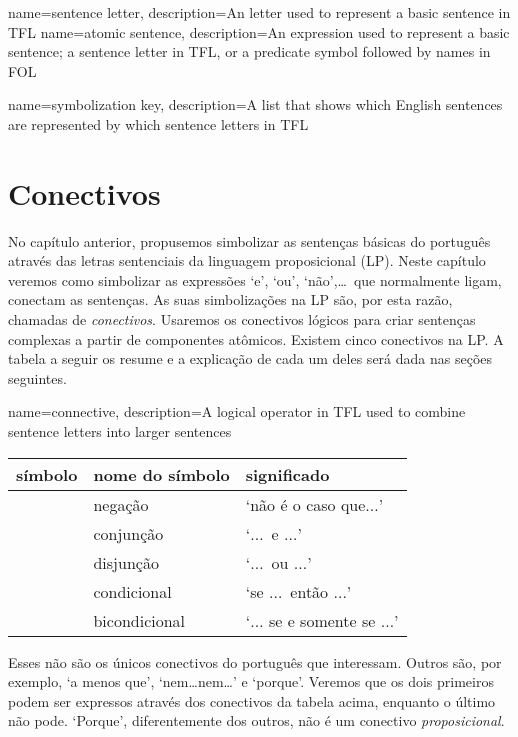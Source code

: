 {
name=sentence letter,
description={An letter used to represent a basic sentence in TFL}
}
{
name=atomic sentence,
description={An expression used to represent a basic sentence; a sentence letter in TFL, or a predicate symbol followed by names in FOL}
}

{
name=symbolization key,
description={A list that shows which English sentences are represented by which \glspl{sentence letter} in TFL}
}


\chapter{Conectivos}
\label{s:TFLConnectives}

No capítulo anterior, propusemos simbolizar as sentenças básicas do português através das letras sentenciais da linguagem proposicional (LP).
Neste capítulo veremos como simbolizar as expressões `e', `ou', `não',\ldots\ 
que normalmente ligam, conectam as sentenças.
As suas simbolizações na LP são, por esta razão, chamadas de \emph{conectivos}.
Usaremos os conectivos lógicos para criar sentenças complexas a partir de componentes atômicos. Existem cinco conectivos na LP.
A tabela a seguir os resume e a explicação de cada um deles será dada nas seções seguintes.


{
name=connective,
description={A logical operator in TFL used to combine \glspl{sentence letter} into larger sentences}
}
	\begin{table}[h]
	\center
	\begin{tabular}{l l l}
	
	\textbf{símbolo}&\textbf{nome do símbolo}&\textbf{significado}\\
	\hline
	\enot&negação&`não é o caso que$\ldots$'\\
	\eand&conjunção&`$\ldots$\ e $\ldots$'\\
	\eor&disjunção&`$\ldots$\ ou $\ldots$'\\
	\eif&condicional&`se $\ldots$\ então $\ldots$'\\
	\eiff&bicondicional&`$\ldots$ se e somente se $\ldots$'\\
	
	\end{tabular}
	\end{table}

Esses não são os únicos conectivos do português que interessam.
Outros são, por exemplo, `a menos que', `nem\ldots{}nem\ldots' e `porque'.
Veremos que os dois primeiros podem ser expressos através dos conectivos da tabela acima, enquanto o último não pode.
`Porque', diferentemente dos outros, não é um conectivo \emph{proposicional}.
        
